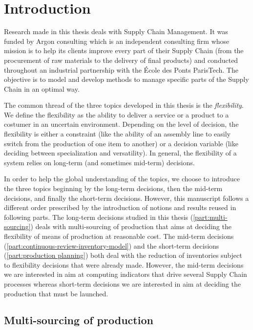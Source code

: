 \chapter{Introduction}
\label{chap:intro:en}


Research made in this thesis deals with Supply Chain Management.
It was funded by Argon consulting which is an independent consulting firm whose mission is to help its clients improve every part of their Supply Chain (from the procurement of raw materials to the delivery of final products) and conducted throughout an industrial partnership with the \'Ecole des Ponts ParisTech.
The objective is to model and develop methods to manage specific parts of the Supply Chain in an optimal way.


The common thread of the three topics developed in this thesis is the \emph{flexibility}.
We define the flexibility as the ability to deliver a service or a product to a costumer in an uncertain environment.
Depending on the level of decision, the flexibility is either a constraint (like the ability of an assembly line to easily switch from the production of one item to another) or a decision variable (like deciding between specialization and versatility).
In general, the flexibility of a system relies on long-term (and sometimes mid-term) decisions.


In order to help the global understanding of the topics, we choose to introduce the three topics beginning by the long-term decisions, then the mid-term decisions, and finally the short-term decisions.
However, this manuscript follows a different order prescribed by the introduction of notions and results reused in following parts.
The long-term decisions studied in this thesis (\cref{part:multi-sourcing}) deals with multi-sourcing of production that aims at deciding the flexibility of means of production at reasonable cost.
The mid-term decisions (\cref{part:continuous-review-inventory-model}) and the short-term decisions (\cref{part:production planning}) both deal with the reduction of inventories subject to flexibility decisions that were already made.
However, the mid-term decisions we are interested in aim at computing indicators that drive several Supply Chain processes whereas short-term decisions we are interested in aim at deciding the production that must be launched.




\section{Multi-sourcing of production}
\label{sec:intro:en:multi-sourcing}


